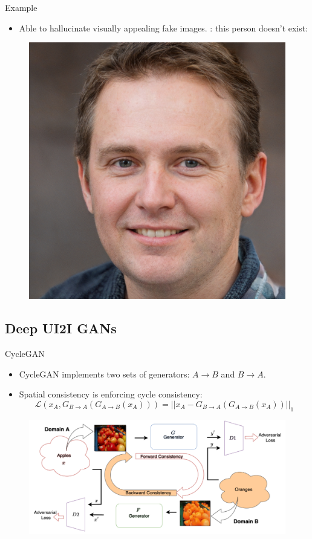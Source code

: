 \begin{frame}{Example}
\begin{itemize}
  \item Able to hallucinate visually appealing fake images. 
  \Eg: this person doesn't exist:
\end{itemize}
\begin{figure}
  \centering
  \includegraphics[width=0.5\linewidth]{../figs/related_work/this_person_doesnt_exist.jpg}
\end{figure}  
\end{frame}

\subsection*{Deep UI2I GANs} 
\begin{frame}{CycleGAN} \label{apndx:cycle_gan}
    \begin{itemize}
      \item CycleGAN implements two sets of generators: $A \rightarrow B$ and $B \rightarrow A$.
      \item Spatial consistency is enforcing cycle consistency:
      \begin{equation}
        \mathcal{L}\left( x_A, G_{B \rightarrow A} \left( G_{A \rightarrow B}(x_A) \right) \right) = 
        ||x_A - G_{B \rightarrow A} \left( G_{A \rightarrow B}(x_A) \right)||_1
      \end{equation}
    \end{itemize}
    \begin{figure}
      \centering
      \includegraphics[width=0.8\linewidth]{../figs/related_work/CycleGAN_arch.png}
    \end{figure}  
  \end{frame}
  
